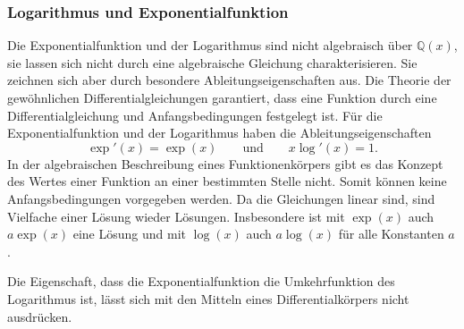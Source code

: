 \subsubsection{Logarithmus und Exponentialfunktion}
Die Exponentialfunktion und der Logarithmus sind nicht algebraisch
über $\mathbb{Q}(x)$, sie lassen sich nicht durch eine algebraische
Gleichung charakterisieren.
Sie zeichnen sich aber durch besondere Ableitungseigenschaften aus.
Die Theorie der gewöhnlichen Differentialgleichungen garantiert,
dass eine Funktion durch eine Differentialgleichung und Anfangsbedingungen
festgelegt ist.
Für die Exponentialfunktion und der Logarithmus haben die 
Ableitungseigenschaften
\[
\exp'(x) = \exp(x)
\qquad\text{und}\qquad
x \log'(x) = 1.
\]
%
%
In der algebraischen Beschreibung eines Funktionenkörpers gibt es
das Konzept des Wertes einer Funktion an einer bestimmten Stelle nicht.
Somit können keine Anfangsbedingungen vorgegeben werden.
Da die Gleichungen linear sind, sind Vielfache einer Lösung wieder
Lösungen.
Insbesondere ist mit $\exp(x)$ auch $a\exp(x)$ eine Lösung und mit
$\log(x)$ auch $a\log(x)$ für alle Konstanten $a$.

Die Eigenschaft, dass die Exponentialfunktion die Umkehrfunktion
des Logarithmus ist, lässt sich mit den Mitteln eines Differentialkörpers
nicht ausdrücken.

